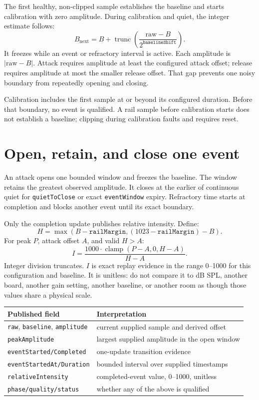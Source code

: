 \documentclass[11pt]{article}
\begin{document}
The first healthy, non-clipped sample establishes the baseline and starts
calibration with zero amplitude. During calibration and quiet, the integer
estimate follows:
\[
B_{\mathrm{next}}=B+\operatorname{trunc}\!\left(
\frac{\text{raw}-B}{2^{\texttt{baselineShift}}}\right).
\]
It freezes while an event or refractory interval is active. Each amplitude is
\(\lvert\text{raw}-B\rvert\). Attack requires amplitude at least the configured
attack offset; release requires amplitude at most the smaller release offset.
That gap prevents one noisy boundary from repeatedly opening and closing.

Calibration includes the first sample at or beyond its configured duration.
Before that boundary, no event is qualified. A rail sample before calibration
starts does not establish a baseline; clipping during calibration faults and
requires reset.

\section{Open, retain, and close one event}
An attack opens one bounded window and freezes the baseline. The window retains
the greatest observed amplitude. It closes at the earlier of continuous quiet
for \texttt{quietToClose} or exact \texttt{eventWindow} expiry. Refractory time
starts at completion and blocks another event until its exact boundary.

Only the completion update publishes relative intensity. Define:
\[
H=\max(B-\texttt{railMargin},(1023-\texttt{railMargin})-B).
\]
For peak \(P\), attack offset \(A\), and valid \(H>A\):
\[
I=
\frac{1000\cdot\operatorname{clamp}(P-A,0,H-A)}{H-A}.
\]
Integer division truncates. \(I\) is exact replay evidence in the range
0--1000 for this configuration and baseline. It is unitless: do not compare it
to dB SPL, another board, another gain setting, another baseline, or another
room as though those values share a physical scale.

\begin{tabularx}{\linewidth}{@{}l X@{}}
\toprule
Published field & Interpretation\\
\midrule
\texttt{raw}, \texttt{baseline}, \texttt{amplitude} & current supplied sample and derived offset\\
\texttt{peakAmplitude} & largest supplied amplitude in the open window\\
\texttt{eventStarted/Completed} & one-update transition evidence\\
\texttt{eventStartedAt/Duration} & bounded interval over supplied timestamps\\
\texttt{relativeIntensity} & completed-event value, 0--1000, unitless\\
\texttt{phase/quality/status} & whether any of the above is qualified\\
\bottomrule
\end{tabularx}
\end{document}
